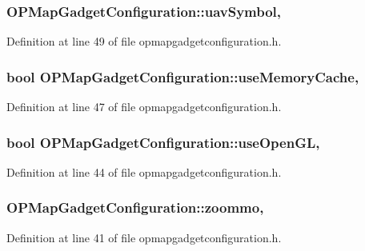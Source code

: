 \hypertarget{group___o_p_map_plugin_ga34e796aad89f226209a7325c28af859a}{
\subsubsection[{uav\-Symbol}]{ O\-P\-Map\-Gadget\-Configuration\-::uav\-Symbol\hspace{0.3cm}{\ttfamily [read]}, {\ttfamily [write]}}}\label{group___o_p_map_plugin_ga34e796aad89f226209a7325c28af859a}


Definition at line 49 of file opmapgadgetconfiguration.\-h.

\hypertarget{group___o_p_map_plugin_gae936e72883265ab40e9b30a0baaed122}{
\subsubsection[{use\-Memory\-Cache}]{\setlength{\rightskip}{0pt plus 5cm}bool O\-P\-Map\-Gadget\-Configuration\-::use\-Memory\-Cache\hspace{0.3cm}{\ttfamily [read]}, {\ttfamily [write]}}}\label{group___o_p_map_plugin_gae936e72883265ab40e9b30a0baaed122}


Definition at line 47 of file opmapgadgetconfiguration.\-h.

\hypertarget{group___o_p_map_plugin_gae922073575fb74cc0fa15b73223982ac}{
\subsubsection[{use\-Open\-G\-L}]{\setlength{\rightskip}{0pt plus 5cm}bool O\-P\-Map\-Gadget\-Configuration\-::use\-Open\-G\-L\hspace{0.3cm}{\ttfamily [read]}, {\ttfamily [write]}}}\label{group___o_p_map_plugin_gae922073575fb74cc0fa15b73223982ac}


Definition at line 44 of file opmapgadgetconfiguration.\-h.

\hypertarget{group___o_p_map_plugin_gac07e4414a740f31223ffb1ce430ca3e8}{
\subsubsection[{zoommo}]{ O\-P\-Map\-Gadget\-Configuration\-::zoommo\hspace{0.3cm}{\ttfamily [read]}, {\ttfamily [write]}}}\label{group___o_p_map_plugin_gac07e4414a740f31223ffb1ce430ca3e8}


Definition at line 41 of file opmapgadgetconfiguration.\-h.

